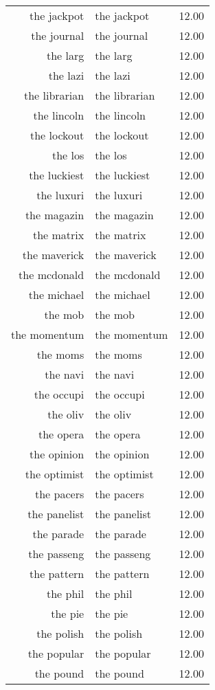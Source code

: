 \begin{table}[ht]
\begin{tabular}{rlr}
  the jackpot & the jackpot & 12.00 \\ 
  the journal & the journal & 12.00 \\ 
  the larg & the larg & 12.00 \\ 
  the lazi & the lazi & 12.00 \\ 
  the librarian & the librarian & 12.00 \\ 
  the lincoln & the lincoln & 12.00 \\ 
  the lockout & the lockout & 12.00 \\ 
  the los & the los & 12.00 \\ 
  the luckiest & the luckiest & 12.00 \\ 
  the luxuri & the luxuri & 12.00 \\ 
  the magazin & the magazin & 12.00 \\ 
  the matrix & the matrix & 12.00 \\ 
  the maverick & the maverick & 12.00 \\ 
  the mcdonald & the mcdonald & 12.00 \\ 
  the michael & the michael & 12.00 \\ 
  the mob & the mob & 12.00 \\ 
  the momentum & the momentum & 12.00 \\ 
  the moms & the moms & 12.00 \\ 
  the navi & the navi & 12.00 \\ 
  the occupi & the occupi & 12.00 \\ 
  the oliv & the oliv & 12.00 \\ 
  the opera & the opera & 12.00 \\ 
  the opinion & the opinion & 12.00 \\ 
  the optimist & the optimist & 12.00 \\ 
  the pacers & the pacers & 12.00 \\ 
  the panelist & the panelist & 12.00 \\ 
  the parade & the parade & 12.00 \\ 
  the passeng & the passeng & 12.00 \\ 
  the pattern & the pattern & 12.00 \\ 
  the phil & the phil & 12.00 \\ 
  the pie & the pie & 12.00 \\ 
  the polish & the polish & 12.00 \\ 
  the popular & the popular & 12.00 \\ 
  the pound & the pound & 12.00 \\ 

\end{tabular}
\end{table}
